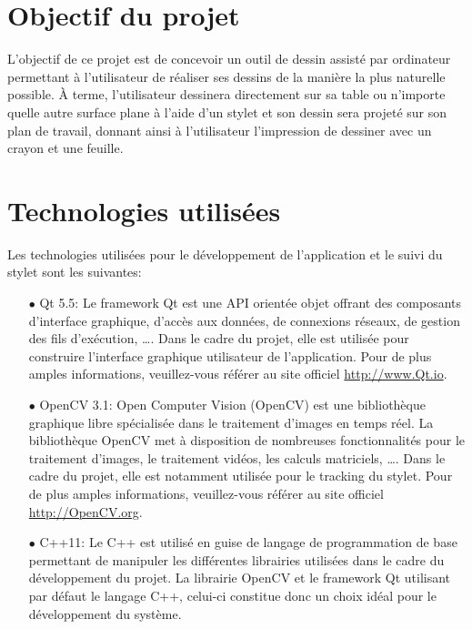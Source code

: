 \documentclass[11pt,a4paper,oldfontcommands]{memoir}
\begin{document}
\newpage

\section{Objectif du projet}

L'objectif de ce projet est de concevoir un outil de dessin assisté par ordinateur permettant à l'utilisateur de réaliser ses dessins de la manière la plus naturelle possible. À terme, l'utilisateur dessinera directement sur sa table ou n'importe quelle autre surface plane à l'aide d'un stylet et son dessin sera projeté sur son plan de travail, donnant ainsi à l'utilisateur l'impression de dessiner avec un crayon et une feuille.

\section{Technologies utilisées}

Les technologies utilisées pour le développement de l'application et le suivi du stylet sont les suivantes:

\begin{itemize}
\item[$\bullet$] Qt 5.5: Le framework Qt est une API orientée objet offrant des composants d'interface graphique, d'accès aux données, de connexions réseaux, de gestion des fils d'exécution, \dots. Dans le cadre du projet, elle est utilisée pour construire l'interface graphique utilisateur de l'application. Pour de plus amples informations, veuillez-vous référer au site officiel \url{http://www.Qt.io}.
\item[$\bullet$] OpenCV 3.1: Open Computer Vision (OpenCV) est une bibliothèque graphique libre spécialisée dans le traitement d'images en temps réel. La bibliothèque OpenCV met à disposition de nombreuses fonctionnalités pour le traitement d'images, le traitement vidéos, les calculs matriciels, \dots. Dans le cadre du projet, elle est notamment utilisée pour le tracking du stylet. Pour de plus amples informations, veuillez-vous référer au site officiel \url{http://OpenCV.org}.
\item[$\bullet$] C++11: Le C++ est utilisé en guise de langage de programmation de base permettant de manipuler les différentes librairies utilisées dans le cadre du développement du projet. La librairie OpenCV et le framework Qt utilisant par défaut le langage C++, celui-ci constitue donc un choix idéal pour le développement du système.
\end{itemize}
\end{document}
